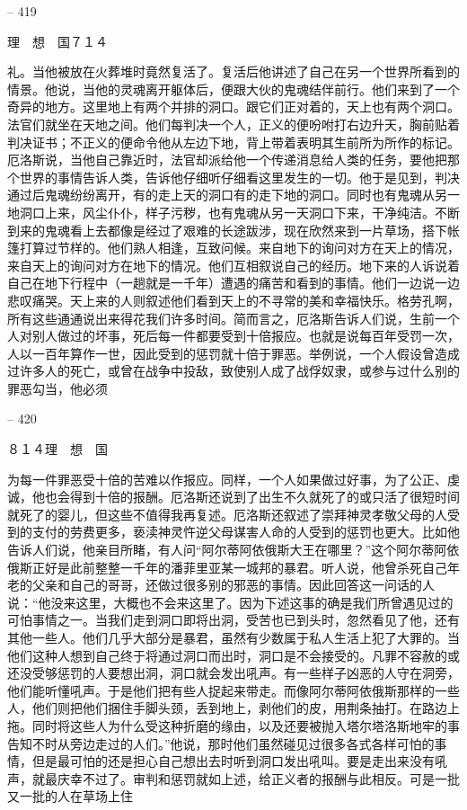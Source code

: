 \documentclass[11pt,oneside]{book}
\begin{document}
\begin{common-format}
    

-- 419

    理　想　国７１４

    礼。当他被放在火葬堆时竟然复活了。复活后他讲述了自己在另一个世界所看到的情景。他说，当他的灵魂离开躯体后，便跟大伙的鬼魂结伴前行。他们来到了一个奇异的地方。这里地上有两个并排的洞口。跟它们正对着的，天上也有两个洞口。法官们就坐在天地之间。他们每判决一个人，正义的便吩咐打右边升天，胸前贴着判决证书；不正义的便命令他从左边下地，背上带着表明其生前所为所作的标记。厄洛斯说，当他自己靠近时，法官却派给他一个传递消息给人类的任务，要他把那个世界的事情告诉人类，告诉他仔细听仔细看这里发生的一切。他于是见到，判决通过后鬼魂纷纷离开，有的走上天的洞口有的走下地的洞口。同时也有鬼魂从另一地洞口上来，风尘仆仆，样子污秽，也有鬼魂从另一天洞口下来，干净纯洁。不断到来的鬼魂看上去都像是经过了艰难的长途跋涉，现在欣然来到一片草场，搭下帐篷打算过节样的。他们熟人相逢，互致问候。来自地下的询问对方在天上的情况，来自天上的询问对方在地下的情况。他们互相叙说自己的经历。地下来的人诉说着自己在地下行程中（一趟就是一千年）遭遇的痛苦和看到的事情。他们一边说一边悲叹痛哭。天上来的人则叙述他们看到天上的不寻常的美和幸福快乐。格劳孔啊，所有这些通通说出来得花我们许多时间。简而言之，厄洛斯告诉人们说，生前一个人对别人做过的坏事，死后每一件都要受到十倍报应。也就是说每百年受罚一次，人以一百年算作一世，因此受到的惩罚就十倍于罪恶。举例说，一个人假设曾造成过许多人的死亡，或曾在战争中投敌，致使别人成了战俘奴隶，或参与过什么别的罪恶勾当，他必须

    

-- 420

    ８１４理　想　国

    为每一件罪恶受十倍的苦难以作报应。同样，一个人如果做过好事，为了公正、虔诚，他也会得到十倍的报酬。厄洛斯还说到了出生不久就死了的或只活了很短时间就死了的婴儿，但这些不值得我再复述。厄洛斯还叙述了崇拜神灵孝敬父母的人受到的支付的劳费更多，亵渎神灵忤逆父母谋害人命的人受到的惩罚也更大。比如他告诉人们说，他亲目所睹，有人问“阿尔蒂阿依俄斯大王在哪里？”这个阿尔蒂阿依俄斯正好是此前整整一千年的潘菲里亚某一城邦的暴君。听人说，他曾杀死自己年老的父亲和自己的哥哥，还做过很多别的邪恶的事情。因此回答这一问话的人说：“他没来这里，大概也不会来这里了。因为下述这事的确是我们所曾遇见过的可怕事情之一。当我们走到洞口即将出洞，受苦也已到头时，忽然看见了他，还有其他一些人。他们几乎大部分是暴君，虽然有少数属于私人生活上犯了大罪的。当他们这种人想到自己终于将通过洞口而出时，洞口是不会接受的。凡罪不容赦的或还没受够惩罚的人要想出洞，洞口就会发出吼声。有一些样子凶恶的人守在洞旁，他们能听懂吼声。于是他们把有些人捉起来带走。而像阿尔蒂阿依俄斯那样的一些人，他们则把他们捆住手脚头颈，丢到地上，剥他们的皮，用荆条抽打。在路边上拖。同时将这些人为什么受这种折磨的缘由，以及还要被抛入塔尔塔洛斯地牢的事告知不时从旁边走过的人们。”他说，那时他们虽然碰见过很多各式各样可怕的事情，但是最可怕的还是担心自己想出去时听到洞口发出吼叫。要是走出来没有吼声，就最庆幸不过了。审判和惩罚就如上述，给正义者的报酬与此相反。可是一批又一批的人在草场上住


\end{common-format}
\end{document}
